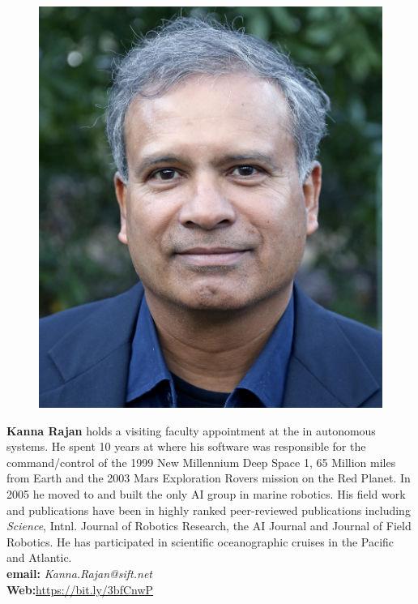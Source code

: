 \documentclass[12pt]{article}
\begin{document}
\parbox{6.25in}{
\begin{figure}
  \centering
  \includegraphics[width=.75\linewidth]{fig/Krajan.png}
\end{figure}
\textbf{Kanna Rajan}\footnotemark{} holds a visiting faculty appointment at the \univ
in autonomous systems. He spent 10 years at \inst where his software
was responsible for the command/control of the 1999 New Millennium
Deep Space 1, 65 Million miles from Earth and the 2003 Mars
Exploration Rovers mission on the Red Planet. In 2005 he moved to \mba
and built the only AI group in marine robotics. His field work and
publications have been in highly ranked peer-reviewed publications
including \emph{Science}, Intnl. Journal of Robotics Research, the AI
Journal and Journal of Field Robotics. He has participated in
scientific oceanographic cruises in the Pacific and Atlantic.
\\
\textbf{email: }\emph{Kanna.Rajan@sift.net}\\
\textbf{Web:}\url{https://bit.ly/3bfCnwP}
 }

\newpage
\vspace*{0.5cm}
\end{document}
